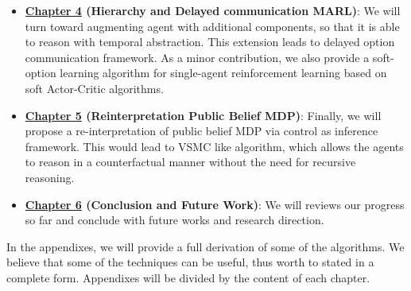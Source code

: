 \begin{itemize}
    \item \textbf{\hyperref[chapter:chap4]{Chapter 4} (Hierarchy and Delayed communication MARL)}: We will turn toward augmenting agent with additional components, so that it is able to reason with temporal abstraction. This extension leads to delayed option communication framework. As a minor contribution, we also provide a soft-option learning algorithm for single-agent reinforcement learning based on soft Actor-Critic algorithms.
    \item \textbf{\hyperref[chapter:chap5]{Chapter 5} (Reinterpretation Public Belief MDP)}: Finally, we will propose a re-interpretation of public belief MDP via control as inference framework. This would lead to VSMC like algorithm, which allows the agents to reason in a counterfactual manner without the need for recursive reasoning.
    \item \textbf{\hyperref[chapter:chap6]{Chapter 6} (Conclusion and Future Work)}: We will reviews our progress so far and conclude with future works and research direction. 
\end{itemize}
In the appendixes, we will provide a full derivation of some of the algorithms. We believe that some of the techniques can be useful, thus worth to stated in a complete form. Appendixes will be divided by the content of each chapter. 